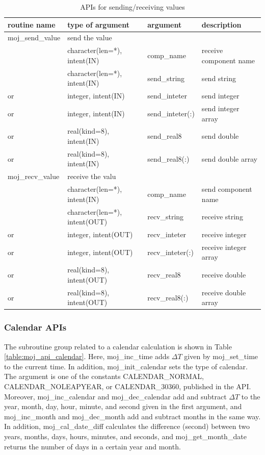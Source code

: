 \documentclass[11pt,a4paper]{report}
\newcommand{\tabref}[1]{Table \ref{#1}}
\begin{document}
\begin{table}[H]
\begin{center}
\caption{APIs for sending/receiving values}
{\small
\label{table:moj_api_sendrecv}
\begin{tabular}{llll}
\hline\hline
routine name & type of argument & argument　& description \\
\hline
 moj\_send\_value &  \multicolumn{3}{l}{send the value}\\
           &  character(len=*), intent(IN) & comp\_name  & receive component name\\
           & character(len=*), intent(IN)  & send\_string & send string\\
or         & integer, intent(IN) & send\_inteter & send integer\\
or         & integer, intent(IN) & send\_inteter(:) & send integer array\\
or         & real(kind=8), intent(IN) & send\_real8 & send double\\
or         & real(kind=8), intent(IN) & send\_real8(:) & send double array\\
\hline
 moj\_recv\_value &  \multicolumn{3}{l}{receive the valu}\\
           &  character(len=*), intent(IN) & comp\_name  & send component name\\
           & character(len=*), intent(OUT)  & recv\_string & receive string\\
or         & integer, intent(OUT) & recv\_inteter & receive integer\\
or         & integer, intent(OUT) & recv\_inteter(:) & receive integer array\\
or         & real(kind=8), intent(OUT) & recv\_real8 & receive double\\
or         & real(kind=8), intent(OUT) & recv\_real8(:) & receive double array\\
\hline\hline
\end{tabular}
}
\end{center}
\end{table}

\subsubsection{Calendar APIs}
The subroutine group related to a calendar calculation is shown in \tabref{table:moj_api_calendar}. 
Here, moj\_inc\_time adds $\Delta{T}$ given by moj\_set\_time to the current time. 
In addition, moj\_init\_calendar sets the type of calendar. 
The argument is one of the constants CALENDAR\_NORMAL, CALENDAR\_NOLEAPYEAR, or CALENDAR\_30360, published in the API. 
Moreover, moj\_inc\_calendar and moj\_dec\_calendar add and subtract $\Delta{T}$ to the year, month, day, hour, minute, and second given in the first argument, and
moj\_inc\_month and moj\_dec\_month add and subtract months in the same way. 
In addition, moj\_cal\_date\_diff calculates the difference (second) between two years, months, days, hours, minutes, and seconds, and
moj\_get\_month\_date returns the number of days in a certain year and month.
\end{document}
